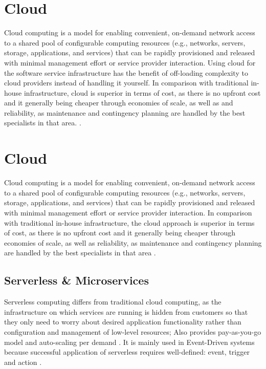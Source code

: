 \section{Cloud}
Cloud computing is a model for enabling convenient, on-demand network access to a shared pool of configurable computing
resources (e.g., networks, servers, storage, applications, and services) that can be rapidly provisioned and released with minimal management effort or service provider interaction. \cite {cloudDef}
Using cloud for the software service infrastructure has the benefit of off-loading complexity to cloud providers instead of handling it yourself. In comparison with traditional in-house infrastructure, cloud is superior in terms of cost, as there is no upfront cost and it generally being cheaper through economies of scale, as well as and reliability, as maintenance and contingency planning are handled by the best specialists in that area.  \cite{armbrust2009above, hajjat2010cloudward}.  
\section{Cloud}
Cloud computing is a model for enabling convenient, on-demand network access to a shared pool of configurable computing
resources (e.g., networks, servers, storage, applications, and services) that can be rapidly provisioned and released with minimal management effort or service provider interaction. \cite {cloudDef}
In comparison with traditional in-house infrastructure, the cloud approach is superior in terms of cost, as there is no upfront cost and it generally being cheaper through economies of scale, as well as reliability, as maintenance and contingency planning are handled by the best specialists in that area  \cite{armbrust2009above, hajjat2010cloudward}.  
\subsection{Serverless \& Microservices}
Serverless computing differs from traditional cloud computing, as the infrastructure on which services are running is hidden from customers so that they only need to worry about desired application functionality rather than configuration and management of low-level resources; Also provides pay-as-you-go model and auto-scaling per demand \cite{serverless1}.  It is mainly used in Event-Driven systems because successful application of serverless requires well-defined: event, trigger and action \cite{MALAWSKI2020502, serverless2}. 

